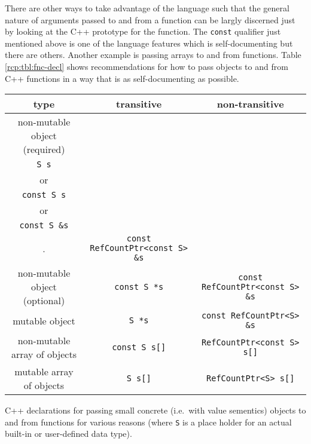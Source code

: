 There are other ways to take advantage of the language such that the
general nature of arguments passed to and from a function can be
largly discerned just by looking at the C++ prototype for the
function.  The \texttt{const} qualifier just mentioned above is one of
the language features which is self-documenting but there are others.
Another example is passing arrays to and from functions.  Table
\ref{rcp:tbl:fnc-decl} shows recommendations for how to pass objects
to and from C++ functions in a way that is as self-documenting as
possible.

\begin{table}
%
\begin{minipage}{\textwidth}
\begin{tabular}{|c|c|c|}
\hline
type
& transitive
& non-transitive \\
\hline
non-mutable object (required)
& \begin{minipage}{12ex}
    \begin{center}
    {\tiny .}\\
    \texttt{S s} \\
    or \\
    \texttt{const S s} \\
    or \\
    \texttt{const S \&s} \\
    {\tiny .}
    \end{center}
  \end{minipage}
& \texttt{const RefCountPtr<const S> \&s} \\
\hline
non-mutable object (optional)
& \texttt{const S *s}
& \texttt{const RefCountPtr<const S> \&s} \\
\hline
mutable object
& \texttt{S *s}
& \texttt{const RefCountPtr<S> \&s} \\
\hline
non-mutable array of objects
& \texttt{const S s[]}
& \texttt{RefCountPtr<const S> s[]} \\
\hline
mutable array of objects
& \texttt{S s[]}
& \texttt{RefCountPtr<S> s[]} \\
\hline
\end{tabular}
\begin{center}
C++ declarations for passing small concrete (i.e.~with value
sementics) objects to and from functions for various reasons (where
\texttt{S} is a place holder for an actual built-in or user-defined
data type).
\end{center}
\end{minipage}
%
\\[5ex]

\end{table}

